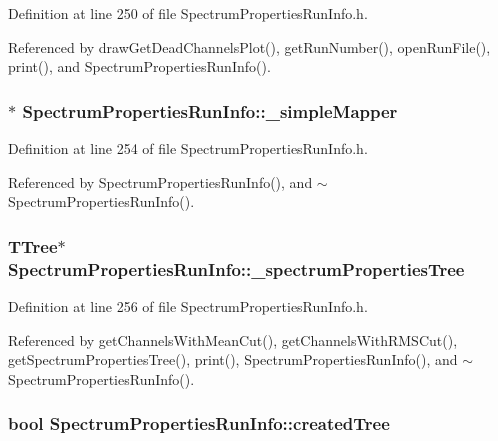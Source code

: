 Definition at line 250 of file SpectrumPropertiesRunInfo.h.

Referenced by drawGetDeadChannelsPlot(), getRunNumber(), openRunFile(), print(), and SpectrumPropertiesRunInfo().\hypertarget{class_spectrum_properties_run_info_a1a2747ac99761940eb128ca041014dc2}{
\subsubsection[{\_\-simpleMapper}]{$\ast$ {\bf SpectrumPropertiesRunInfo::\_\-simpleMapper}}}
\label{class_spectrum_properties_run_info_a1a2747ac99761940eb128ca041014dc2}


Definition at line 254 of file SpectrumPropertiesRunInfo.h.

Referenced by SpectrumPropertiesRunInfo(), and $\sim$SpectrumPropertiesRunInfo().\hypertarget{class_spectrum_properties_run_info_ae3cb4e7dd3f4d8fc02094738ba60cfca}{
\subsubsection[{\_\-spectrumPropertiesTree}]{\setlength{\rightskip}{0pt plus 5cm}TTree$\ast$ {\bf SpectrumPropertiesRunInfo::\_\-spectrumPropertiesTree}}}
\label{class_spectrum_properties_run_info_ae3cb4e7dd3f4d8fc02094738ba60cfca}


Definition at line 256 of file SpectrumPropertiesRunInfo.h.

Referenced by getChannelsWithMeanCut(), getChannelsWithRMSCut(), getSpectrumPropertiesTree(), print(), SpectrumPropertiesRunInfo(), and $\sim$SpectrumPropertiesRunInfo().\hypertarget{class_spectrum_properties_run_info_afcbed8adc08c7cfbca19df402943a770}{
\subsubsection[{createdTree}]{\setlength{\rightskip}{0pt plus 5cm}bool {\bf SpectrumPropertiesRunInfo::createdTree}}}
\label{class_spectrum_properties_run_info_afcbed8adc08c7cfbca19df402943a770}


